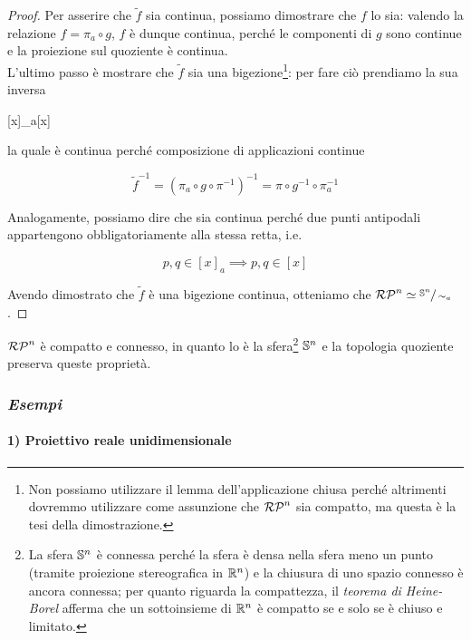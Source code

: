 \begin{proof}
	Per asserire che $ \tilde{f} $ sia continua, possiamo dimostrare che $ f $ lo sia: valendo la relazione $ f = \pi_{a} \circ g $, $ f $ è dunque continua, perché le componenti di $ g $ sono continue e la proiezione sul quoziente è continua.\\
	L'ultimo passo è mostrare che $ \tilde{f} $ sia una bigezione\footnote{%
		Non possiamo utilizzare il lemma dell'applicazione chiusa perché altrimenti dovremmo utilizzare come assunzione che $ \rp{n} $ sia compatto, ma questa è la tesi della dimostrazione.%
	}: per fare ciò prendiamo la sua inversa

		{}{}
		{[x]_{a}}{[x]}

	la quale è continua perché composizione di applicazioni continue
	
	\begin{equation}
		\tilde{f}^{-1} = (\pi_{a} \circ g \circ \pi^{-1})^{-1} = \pi \circ g^{-1} \circ \pi_{a}^{-1}
	\end{equation}

	Analogamente, possiamo dire che sia continua perché due punti antipodali appartengono obbligatoriamente alla stessa retta, i.e.
	
	\begin{equation}
		p,q \in [x]_{a} \implies p,q \in [x]
	\end{equation}

	Avendo dimostrato che $ \tilde{f} $ è una bigezione continua, otteniamo che $ \rp{n} \simeq \sfrac{\S^{n}}{\sim_{a}} $.
\end{proof}

\begin{corollary}
	$ \rp{n} $ è compatto e connesso, in quanto lo è la sfera\footnote{%
		La sfera $ \S^{n} $ è connessa perché la sfera è densa nella sfera meno un punto (tramite proiezione stereografica in $ \R^{n} $) e la chiusura di uno spazio connesso è ancora connessa; per quanto riguarda la compattezza, il \textit{teorema di Heine-Borel} afferma che un sottoinsieme di $ \R^{n} $ è compatto se e solo se è chiuso e limitato.%
	} $ \S^{n} $ e la topologia quoziente preserva queste proprietà.
\end{corollary}

\subsubsection{\textit{Esempi}}

\paragraph{1) Proiettivo reale unidimensionale}


